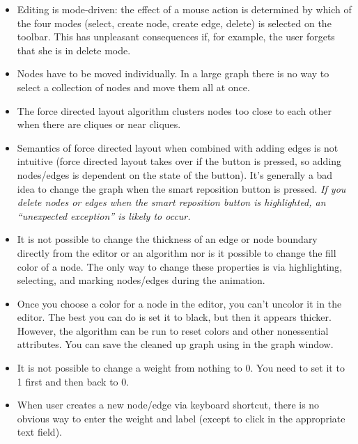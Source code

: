 \begin{itemize}

\item Editing is mode-driven: the effect of a mouse action is determined by
  which of the four modes (select, create node, create edge, delete) is
  selected on the toolbar. This has unpleasant consequences if, for example,
  the user forgets that she is in delete mode.

\item Nodes have to be moved individually. In a large graph there is no way
  to select a collection of nodes and move them all at once.

\item The force directed layout algorithm clusters nodes too close to each
  other when there are cliques or near cliques.

\item Semantics of force directed layout when combined with adding edges is
  not intuitive (force directed layout takes over if the button is pressed,
  so adding nodes/edges is dependent on the state of the button). It's
  generally a bad idea to change the graph when the smart reposition button
  is pressed. \emph{If you delete nodes or edges when the smart reposition
    button is highlighted, an ``unexpected exception'' is likely to occur.}

\item It is not possible to change the thickness of an edge or node boundary
  directly from the editor or an algorithm nor is it possible to change the
  fill color of a node.  The only way to change these properties is via
  highlighting, selecting, and marking nodes/edges during the animation.

\item Once you choose a color for a node in the editor, you can't uncolor it in
  the editor. The best you can do is set it to black, but then it appears
  thicker. However, the algorithm  can be run to
  reset colors and other nonessential attributes. You can save the cleaned up
  graph using  in the graph window.

\item It is not possible to change a weight from nothing to 0. You need to
  set it to 1 first and then back to 0.

\item When user creates a new node/edge via keyboard shortcut, there is no
  obvious way to enter the weight and label (except to click in the
  appropriate text field).

\end{itemize}

